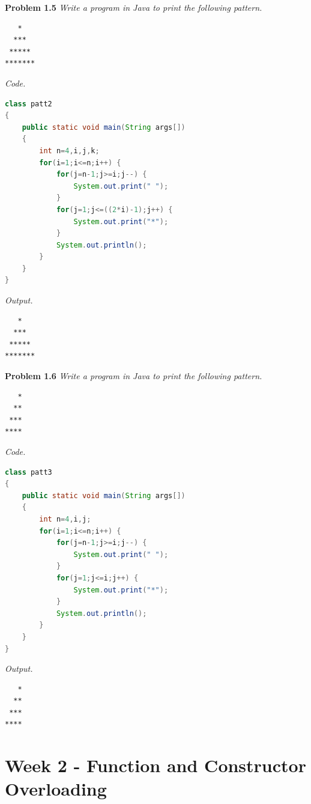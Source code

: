 \documentclass[12pt]{article}
\begin{document}
\textbf{Problem 1.5} \textit{Write a program in Java to print the following pattern.}

\begin{lstlisting}
   *
  ***
 *****
*******
\end{lstlisting}

\textit{Code.}

\begin{lstlisting}[language=Java]
class patt2
{
	public static void main(String args[])
	{
		int n=4,i,j,k;
		for(i=1;i<=n;i++) {
			for(j=n-1;j>=i;j--) {
				System.out.print(" ");
			}
			for(j=1;j<=((2*i)-1);j++) {
				System.out.print("*");
			}
			System.out.println();
		}
	}
}
\end{lstlisting}

\textit{Output.}
\begin{lstlisting}
   *
  ***
 *****
*******
\end{lstlisting}

\textbf{Problem 1.6} \textit{Write a program in Java to print the following pattern.}

\begin{lstlisting}
   *
  **
 ***
****
\end{lstlisting}

\textit{Code.}

\begin{lstlisting}[language=Java]
class patt3
{
	public static void main(String args[])
	{
		int n=4,i,j;
		for(i=1;i<=n;i++) {
			for(j=n-1;j>=i;j--) {
				System.out.print(" ");
			}
			for(j=1;j<=i;j++) {
				System.out.print("*");
			}
			System.out.println();
		}
	}
}
\end{lstlisting}

\textit{Output.}
\begin{lstlisting}
   *
  **
 ***
****
\end{lstlisting}

\newpage


\setlength{\fboxrule}{.5mm}\setlength{\fboxsep}{1.2mm}
\addtolength{\boxlength}{-4mm}
\begin{center}\end{center}
\vspace{5mm}

\section{Week 2 - Function and Constructor Overloading}
\end{document}
